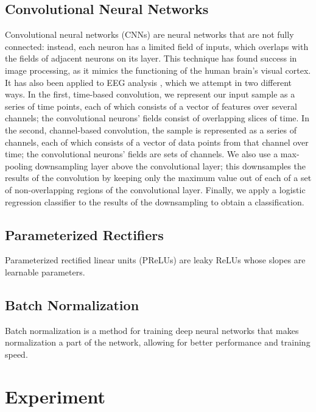 \documentclass{article} %
\begin{document}
\subsection{Convolutional Neural Networks}
Convolutional neural networks (CNNs) \cite{DBLP:conf/nips/KrizhevskySH12} are neural networks that are not fully connected: instead, each neuron has a limited field of inputs, which overlaps with the fields of adjacent neurons on its layer.  This technique has found success in image processing, as it mimics the functioning of the human brain's visual cortex.  It has also been applied to EEG analysis \cite{DBLP:journals/pami/CecottiG11}, which we attempt in two different ways.  In the first, time-based convolution, we represent our input sample as a series of time points, each of which consists of a vector of features over several channels; the convolutional neurons' fields consist of overlapping slices of time.  In the second, channel-based convolution, the sample is represented as a series of channels, each of which consists of a vector of data points from that channel over time; the convolutional neurons' fields are sets of channels.  We also use a max-pooling downsampling layer above the convolutional layer; this downsamples the results of the convolution by keeping only the maximum value out of each of a set of non-overlapping regions of the convolutional layer.  Finally, we apply a logistic regression classifier to the results of the downsampling to obtain a classification.
\subsection{Parameterized Rectifiers}
Parameterized rectified linear units (PReLUs) \cite{DBLP:journals/corr/HeZR015} are leaky ReLUs whose slopes are learnable parameters.
\subsection{Batch Normalization}
Batch normalization \cite{DBLP:journals/corr/IoffeS15} is a method for training deep neural networks that makes normalization a part of the network, allowing for better performance and training speed.

\section{Experiment} \label{section:experiment}
\end{document}
